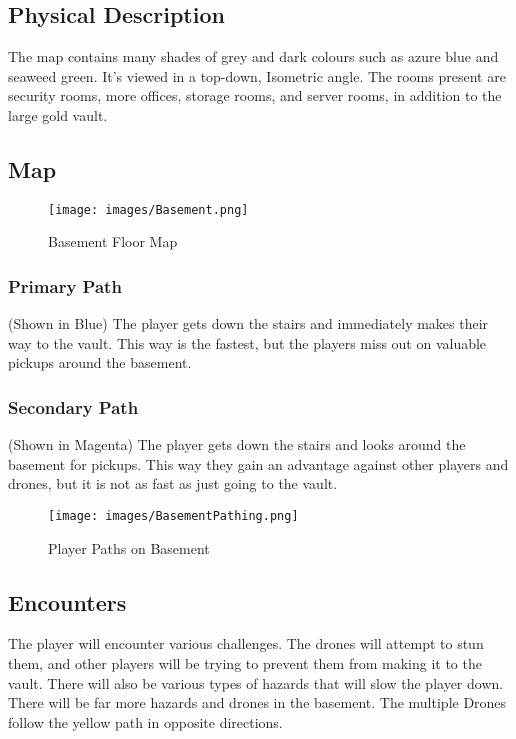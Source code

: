 \documentclass[11pt]{report}
\begin{document}
\subsection{Physical Description}

The map contains many shades of grey and dark colours such as azure blue and seaweed green. It’s viewed in a top-down, Isometric angle. The rooms present are security rooms, more offices, storage rooms, and server rooms, in addition to the large gold vault.

\subsection{Map}

\begin{figure}[H]
    \centering
    \texttt{[image: images/Basement.png]}
    \caption{Basement Floor Map}
\end{figure}

\subsubsection{Primary Path}

(Shown in Blue) The player gets down the stairs and immediately makes their way to the vault. This way is the fastest, but the players miss out on valuable pickups around the basement.

\subsubsection{Secondary Path}

(Shown in Magenta) The player gets down the stairs and looks around the basement for pickups. This way they gain an advantage against other players and drones, but it is not as fast as just going to the vault.


\begin{figure}[H]
    \centering
    \texttt{[image: images/BasementPathing.png]}
    \caption{Player Paths on Basement}
\end{figure}

\subsection{Encounters}

The player will encounter various challenges. The drones will attempt to stun them, and other players will be trying to prevent them from making it to the vault. There will also be various types of hazards that will slow the player down. There will be far more hazards and drones in the basement. The multiple Drones follow the yellow path in opposite directions.
\end{document}
